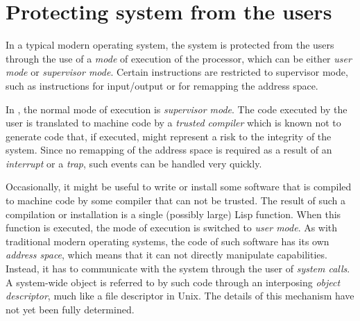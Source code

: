 \section{Protecting system from the users}

In a typical modern operating system, the system is protected from the
users through the use of a \emph{mode} of execution of the processor,
which can be either \emph{user mode} or \emph{supervisor mode}.
Certain instructions are restricted to supervisor mode, such as
instructions for input/output or for remapping the address space. 

In \sysname{}, the normal mode of execution is \emph{supervisor mode}.
The code executed by the user is translated to machine code by a
\emph{trusted compiler} which is known not to generate code that, if
executed, might represent a risk to the integrity of the system.
Since no remapping of the address space is required as a result of an
\emph{interrupt} or a \emph{trap}, such events can be handled very
quickly. 

Occasionally, it might be useful to write or install some software
that is compiled to machine code by some compiler that can not be
trusted.  The result of such a compilation or installation is a single
(possibly large) Lisp function.  When this function is executed, the
mode of execution is switched to \emph{user mode}.  As with
traditional modern operating systems, the code of such software has
its own \emph{address space}, which means that it can not directly
manipulate \sysname{} capabilities.  Instead, it has to communicate
with the system through the user of \emph{system calls}.  A
system-wide object is referred to by such code through an interposing
\emph{object descriptor}, much like a file descriptor in Unix.  The
details of this mechanism have not yet been fully determined. 



